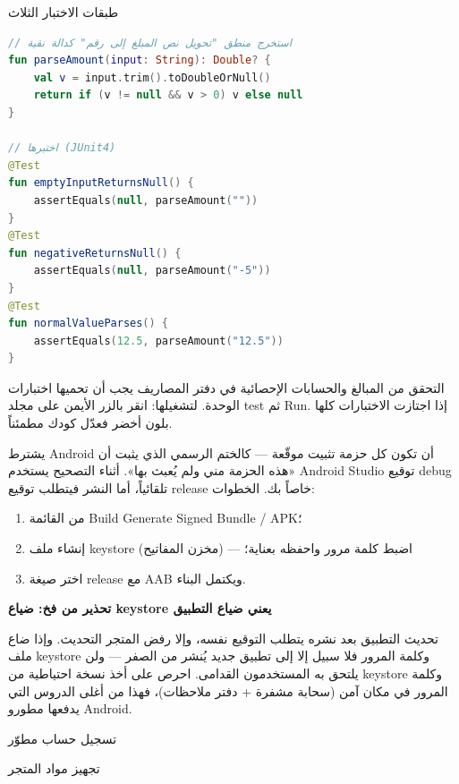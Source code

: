 \begin{center}\small\color{gray}طبقات الاختبار الثلاث\end{center}

\begin{lstlisting}[language=Kotlin]
// استخرج منطق "تحويل نص المبلغ إلى رقم" كدالة نقية
fun parseAmount(input: String): Double? {
    val v = input.trim().toDoubleOrNull()
    return if (v != null && v > 0) v else null
}

// اختبرها (JUnit4)
@Test
fun emptyInputReturnsNull() {
    assertEquals(null, parseAmount(""))
}
@Test
fun negativeReturnsNull() {
    assertEquals(null, parseAmount("-5"))
}
@Test
fun normalValueParses() {
    assertEquals(12.5, parseAmount("12.5"))
}
\end{lstlisting}

التحقق من المبالغ والحسابات الإحصائية في دفتر المصاريف يجب أن تحميها اختبارات الوحدة. لتشغيلها: انقر بالزر الأيمن على مجلد test ثم Run. إذا اجتازت الاختبارات كلها بلون أخضر فعدّل كودك مطمئناً.


يشترط Android أن تكون كل حزمة تثبيت موقّعة — كالختم الرسمي الذي يثبت أن «هذه الحزمة مني ولم يُعبث بها». أثناء التصحيح يستخدم Android Studio توقيع debug تلقائياً، أما النشر فيتطلب توقيع release خاصاً بك. الخطوات:

\begin{enumerate}
  \item من القائمة Build Generate Signed Bundle / APK؛
  \item إنشاء ملف keystore (مخزن المفاتيح) — اضبط كلمة مرور واحفظه بعناية؛
  \item اختر صيغة release مع AAB ويكتمل البناء.
\end{enumerate}

\textbf{تحذير من فخ: ضياع keystore يعني ضياع التطبيق}\par

تحديث التطبيق بعد نشره يتطلب التوقيع نفسه، وإلا رفض المتجر التحديث. وإذا ضاع ملف keystore وكلمة المرور فلا سبيل إلا إلى تطبيق جديد يُنشر من الصفر — ولن يلتحق به المستخدمون القدامى. احرص على أخذ نسخة احتياطية من keystore وكلمة المرور في مكان آمن (سحابة مشفرة + دفتر ملاحظات)، فهذا من أغلى الدروس التي يدفعها مطورو Android.


تسجيل حساب مطوّر

تجهيز مواد المتجر

